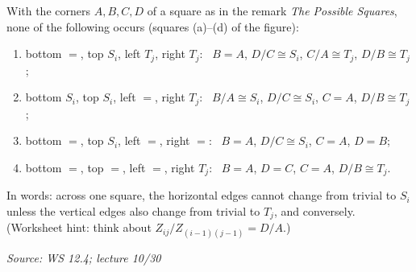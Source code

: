 \documentclass[11pt]{report}
\newcommand{\srcline}[1]{\par\hfill{\footnotesize\textit{Source: #1}}}
\begin{document}
\begin{propbox}\label{prop:jh-impossible-squares}
With the corners $A, B, C, D$ of a square as in the remark \emph{The Possible Squares}, none of the following occurs (squares (a)--(d) of the figure):
\begin{enumerate}[nosep, label=(\alph*)]
    \item bottom $=$, top $S_i$, left $T_j$, right $T_j$: \ $B = A$, $D/C \cong S_i$, $C/A \cong T_j$, $D/B \cong T_j$;
    \item bottom $S_i$, top $S_i$, left $=$, right $T_j$: \ $B/A \cong S_i$, $D/C \cong S_i$, $C = A$, $D/B \cong T_j$;
    \item bottom $=$, top $S_i$, left $=$, right $=$: \ $B = A$, $D/C \cong S_i$, $C = A$, $D = B$;
    \item bottom $=$, top $=$, left $=$, right $T_j$: \ $B = A$, $D = C$, $C = A$, $D/B \cong T_j$.
\end{enumerate}
In words: across one square, the horizontal edges cannot change from trivial to $S_i$ unless the vertical edges also change from trivial to $T_j$, and conversely. (Worksheet hint: think about $Z_{ij}/Z_{(i-1)(j-1)} = D/A$.)
\srcline{WS 12.4; lecture 10/30}
\end{propbox}
\end{document}
